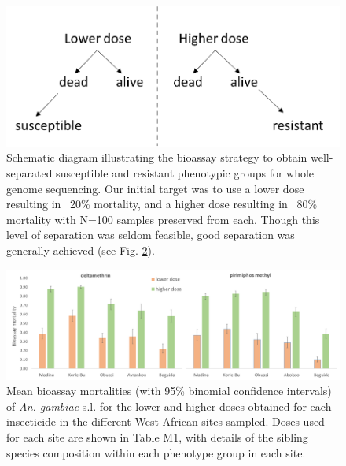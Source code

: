 \documentclass[a4paper,12pt]{article}
\begin{document}
\begin{figure}[h]
	\begin{center}
		\includegraphics*[width = 6.5in]{figures/bioassay_design.png}
	\end{center}
	\caption{\footnotesize Schematic diagram illustrating the bioassay strategy to obtain well-separated susceptible and resistant phenotypic groups for whole genome sequencing. Our initial target was to use a lower dose resulting in ~20\% mortality, and a higher dose resulting in ~80\% mortality with N=100 samples preserved from each. Though this level of separation was seldom feasible, good separation was generally achieved (see Fig. \ref{FigM2}).}
	\label{FigM1}
\end{figure}

\begin{figure}[h]
	\begin{center}
		\includegraphics*[width = 6.5in]{figures/bioassay_results.png}
	\end{center}
	\caption{\footnotesize Mean bioassay mortalities (with 95\% binomial confidence intervals) of \textit{An. gambiae} s.l. for the lower and higher doses obtained for each insecticide in the different West African sites sampled. Doses used for each site are shown in Table M1, with details of the sibling species composition within each phenotype group in each site.}
	\label{FigM2}
\end{figure}

\vskip 1cm
\end{document}
